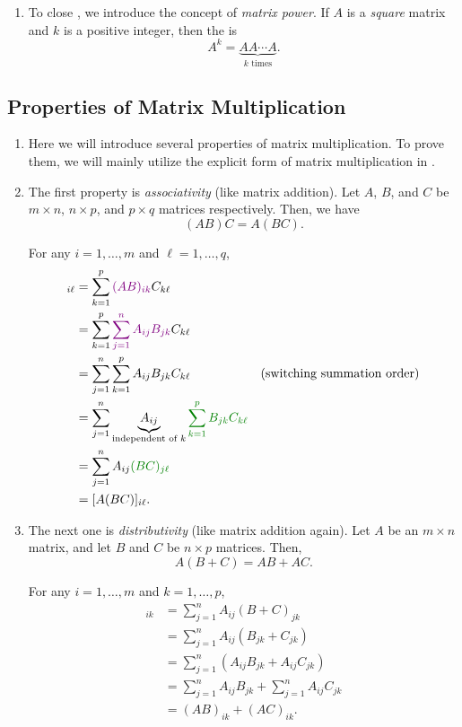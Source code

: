 \begin{enumerate}
\item To close , we introduce the concept of
\emph{matrix power}.  If \(A\) is a \emph{square} matrix and \(k\) is a
positive integer, then the  is
\[
A^k=\underbrace{AA\cdots A}_{\text{\(k\) times}}.
\]
\end{enumerate}
\subsection{Properties of Matrix Multiplication}
\label{subsect:matrix-mult-prop}
\begin{enumerate}
\item Here we will introduce several properties of matrix multiplication. To
prove them, we will mainly utilize the explicit form of matrix
multiplication in .

\item \label{it:matrix-mult-asso}
The first property is \emph{associativity} (like matrix addition). Let
\(A\), \(B\), and \(C\) be \(m\times n\), \(n\times p\), and \(p\times q\)
matrices respectively. Then, we have
\[
(AB)C=A(BC).
\]
\begin{pf}
For any \(i=1,\dotsc,m\) and \(\ell=1,\dotsc,q\),
\begin{align*}
[(AB)C]_{i\ell }&=\sum_{k=1}^{p}\vc{(AB)_{ik}}C_{k\ell}\\
&=\sum_{k=1}^{p}\vc{\sum_{j=1}^{n}A_{ij}B_{jk}}C_{k\ell}\\
&=\sum_{j=1}^{n}\sum_{k=1}^{p}A_{ij}B_{jk}C_{k\ell}&\text{(switching summation order)}\\
&=\sum_{j=1}^{n}\underbrace{A_{ij}}_{\text{independent of \(k\)}}\gc{\sum_{k=1}^{p}B_{jk}C_{k\ell}}\\
&=\sum_{j=1}^{n}A_{ij}\gc{(BC)_{j\ell}}\\
&=[A(BC)]_{i\ell}.
\end{align*}
\end{pf}

\item \label{it:matrix-mult-dist}
The next one is \emph{distributivity} (like matrix addition again). Let \(A\)
be an \(m\times n\) matrix, and let \(B\) and \(C\) be \(n\times p\) matrices.
Then,
\[
A(B+C)=AB+AC.
\]
\begin{pf}
For any \(i=1,\dotsc,m\) and \(k=1,\dotsc,p\),
\begin{align*}
[A(B+C)]_{ik}&=\sum_{j=1}^{n}A_{ij}(B+C)_{jk}\\
&=\sum_{j=1}^{n}A_{ij}(B_{jk}+C_{jk})\\
&=\sum_{j=1}^{n}(A_{ij}B_{jk}+A_{ij}C_{jk})\\
&=\sum_{j=1}^{n}A_{ij}B_{jk}+\sum_{j=1}^{n}A_{ij}C_{jk}\\
&=(AB)_{ik}+(AC)_{ik}.
\end{align*}
\end{pf}


\end{enumerate}
